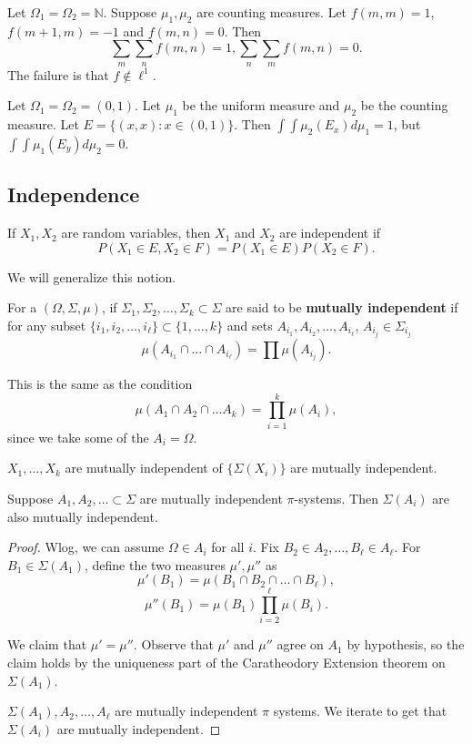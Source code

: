 \documentclass[11pt]{scrartcl}
\newcommand{\N}{\mathbb{N}}
\begin{document}
\begin{example} Let $\Omega_1 = \Omega_2 = \N$.  Suppose $\mu_1, \mu_2$ are counting measures. Let $f(m, m) = 1$, $f(m+1, m) = -1$ and $f(m, n) = 0$.  Then 
$$\sum_m \sum_n f(m, n) = 1, \sum_n \sum_m f(m, n) = 0.$$
The failure is that $f \not \in \ell^1$.
\end{example}
\begin{example} Let $\Omega_1 = \Omega_2 = (0, 1)$.  Let $\mu_1$ be the uniform measure and $\mu_2$ be the counting measure.  Let $E = \{(x, x): x \in (0, 1)\}$.   Then $\int \int \mu_2(E_x) d\mu_1 = 1$, but $\int \int \mu_1(E_y) d\mu_2 = 0$. 
\end{example}
\subsection{Independence}
\begin{definition} If $X_1, X_2$ are random variables, then $X_1$ and $X_2$ are independent if $$P(X_1 \in E, X_2 \in F) = P(X_1 \in E)P(X_2 \in F).$$
\end{definition}
We will generalize this notion.
\begin{definition}[Independence] For a $(\Omega, \Sigma, \mu)$, if $\Sigma_1, \Sigma_2, \dots, \Sigma_k \subset \Sigma$ are said to be 
\textbf{mutually independent} if for any subset $\{i_1, i_2, \dots, i_\ell\} \subset \{1, \dots, k\}$ and sets $A_{i_1}, A_{i_2}, \dots, A_{i_\ell}$, $A_{i_j} \in \Sigma_{i_j}$ 
$$\mu(A_{i_1} \cap \dots \cap A_{i_\ell}) = \prod \mu(A_{i_j}).$$

This is the same as the condition $$\mu(A_1 \cap A_2 \cap \dots A_k) = \prod_{i=1}^k \mu(A_i),$$
since we take some of the $A_i = \Omega$.
\end{definition}
\begin{definition} $X_1, \dots, X_k$ are mutually independent of $\{\Sigma(X_i)\}$ are mutually independent.
\end{definition}
\begin{thm} Suppose $A_1, A_2, \dots \subset \Sigma$ are mutually independent $\pi$-systems.  Then $\Sigma(A_i)$ are also mutually independent.
\end{thm}
\begin{proof}
Wlog, we can assume $\Omega \in A_i$ for all $i$.  Fix $B_2 \in A_2, \dots, B_\ell \in A_\ell$.  For $B_1 \in \Sigma(A_1)$, define the two measures $\mu', \mu''$ as 
$$\mu'(B_1) = \mu(B_1 \cap B_2 \cap \dots\cap B_\ell),$$
$$\mu''(B_1) = \mu(B_1) \prod_{i=2}^\ell \mu(B_i).$$  

We claim that $\mu' = \mu''$.  Observe that $\mu'$ and $\mu''$ agree on $A_1$ by hypothesis, so the claim holds by the uniqueness part of the Caratheodory Extension theorem on $\Sigma(A_1)$.

$\Sigma(A_1), A_2, \dots, A_\ell$ are mutually independent $\pi$ systems.  We iterate to get that $\Sigma(A_i)$ are mutually independent.
\end{proof}
\end{document}
